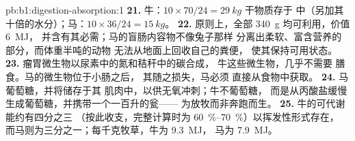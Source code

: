 \begin{solution}{pb:b1:digestion-absorption:1}
\textbf{21.} 牛：$10\times 70/24 = \qty{29}{kg}$ 干物质存于
中（另加其十倍的水分）；马：$10\times 36/24 =
\qty{15}{kg}$。
\textbf{22.} 原则上，全部 \qty{340}{g} 均可利用，价值 \qty{6}{MJ}，
并含有其必需；马的盲肠内容物不像兔子那样
分离出柔软、富含营养的部分，而体重半吨的动物
无法从地面上回收自己的粪便，
使其保持可用状态。
\textbf{23.} 瘤胃微生物以尿素中的氮和秸秆中的碳合成，
牛这些微生物，几乎不需要
膳食。马的微生物位于小肠之后，
其随之损失，马必须
直接从食物中获取。
\textbf{24.} 马葡萄糖，并将储存于其
肌肉中，以供无氧冲刺；牛不葡萄糖，
而是从丙酸盐缓慢生成葡萄糖，并携带一个一百升的瓮——
为放牧而非奔跑而生。
\textbf{25.} 牛的可代谢能约有四分之三
（按此收支，完整计算时为 \qtyrange{60}{70}{\%}）以挥发性形式存在，
而马则为三分之一；每千克牧草，牛为 \qty{9.3}{MJ}，
马为 \qty{7.9}{MJ}。
\end{solution}
